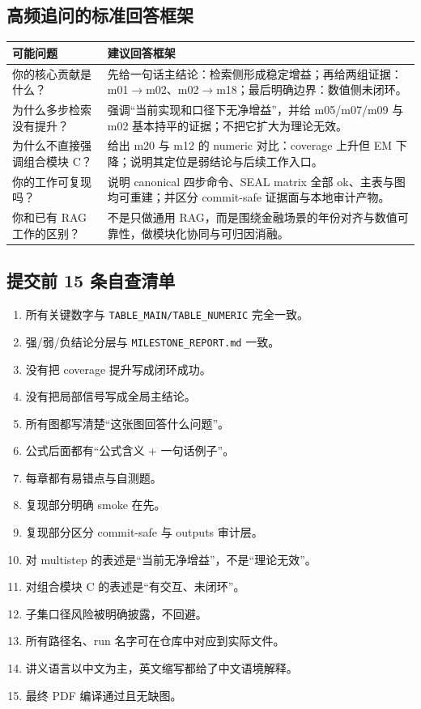 \documentclass[UTF8,a4paper,12pt]{ctexart}
\begin{document}
\subsection*{高频追问的标准回答框架}
\begin{longtable}{>{\raggedright\arraybackslash}p{3.0cm} >{\raggedright\arraybackslash}p{10.3cm}}
\toprule
可能问题 & 建议回答框架 \\
\midrule
\endhead
你的核心贡献是什么？ & 先给一句话主结论：检索侧形成稳定增益；再给两组证据：m01$\rightarrow$m02、m02$\rightarrow$m18；最后明确边界：数值侧未闭环。 \\
为什么多步检索没有提升？ & 强调“当前实现和口径下无净增益”，并给 m05/m07/m09 与 m02 基本持平的证据；不把它扩大为理论无效。 \\
为什么不直接强调组合模块 C？ & 给出 m20 与 m12 的 numeric 对比：coverage 上升但 EM 下降；说明其定位是弱结论与后续工作入口。 \\
你的工作可复现吗？ & 说明 canonical 四步命令、SEAL matrix 全部 ok、主表与图均可重建；并区分 commit-safe 证据面与本地审计产物。 \\
你和已有 RAG 工作的区别？ & 不是只做通用 RAG，而是围绕金融场景的年份对齐与数值可靠性，做模块化协同与可归因消融。 \\
\bottomrule
\end{longtable}

\subsection*{提交前 15 条自查清单}
\begin{enumerate}
  \item 所有关键数字与 \texttt{TABLE\_MAIN/TABLE\_NUMERIC} 完全一致。
  \item 强/弱/负结论分层与 \texttt{MILESTONE\_REPORT.md} 一致。
  \item 没有把 coverage 提升写成闭环成功。
  \item 没有把局部信号写成全局主结论。
  \item 所有图都写清楚“这张图回答什么问题”。
  \item 公式后面都有“公式含义 + 一句话例子”。
  \item 每章都有易错点与自测题。
  \item 复现部分明确 smoke 在先。
  \item 复现部分区分 commit-safe 与 outputs 审计层。
  \item 对 multistep 的表述是“当前无净增益”，不是“理论无效”。
  \item 对组合模块 C 的表述是“有交互、未闭环”。
  \item 子集口径风险被明确披露，不回避。
  \item 所有路径名、run 名字可在仓库中对应到实际文件。
  \item 讲义语言以中文为主，英文缩写都给了中文语境解释。
  \item 最终 PDF 编译通过且无缺图。
\end{enumerate}
\end{document}
